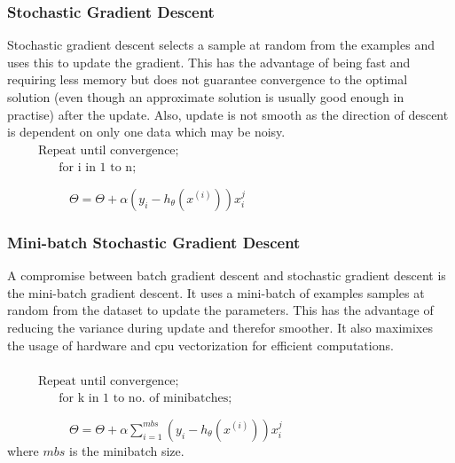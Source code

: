 \documentclass[12pt,a4paper,titlepage,landscape]{book}
\begin{document}
	\subsubsection{Stochastic Gradient Descent}
	Stochastic gradient descent selects a sample at random from the examples and uses this to update the gradient. This has the advantage of being fast and requiring less memory but does not guarantee convergence to the optimal solution (even though an approximate solution is usually good enough in practise) after the update. Also, update is not smooth as the direction of descent is dependent on only one data which may be noisy. \\
	${}\hspace{30pt} \text{Repeat until convergence;} $\\
	${}\hspace{50pt} \text{for i in 1 to n;} $
	
	${}\hspace{60pt} \Theta = \Theta + \alpha\left(y_i - h_\theta(x^{(i)})\right)x_i^j $
	
	\subsubsection{Mini-batch Stochastic Gradient Descent}
	A compromise between batch gradient descent and stochastic gradient descent is the mini-batch gradient descent. It uses a mini-batch of examples samples at random from the dataset  to update the parameters. This has the advantage of reducing the variance during update and therefor smoother. It also maximixes the usage of hardware and cpu vectorization for efficient computations. \\ \\
	${}\hspace{30pt} \text{Repeat until convergence;} $\\
	${}\hspace{50pt} \text{for k in 1 to no. of minibatches;} $
	 
	${}\hspace{60pt}\Theta = \Theta + \alpha\sum_{i=1}^{mbs}\left(y_i - h_\theta(x^{(i)})\right)x_i^j $\\
	where $mbs$ is the minibatch size.
	 	
\end{document}
